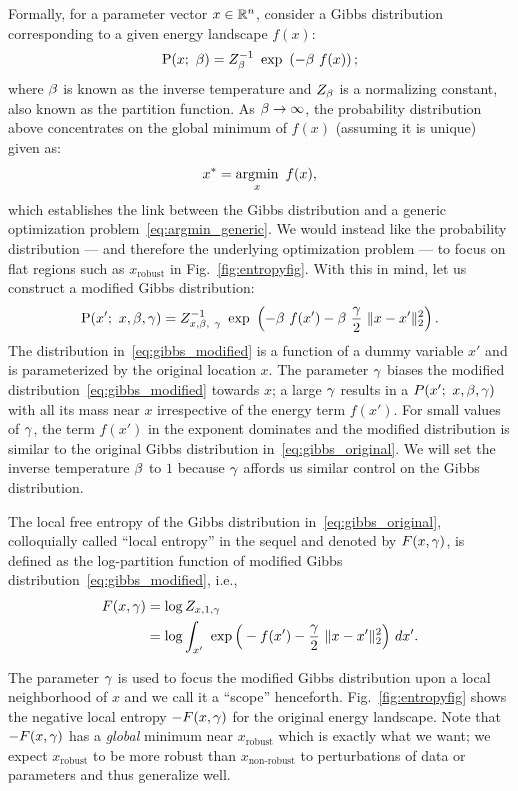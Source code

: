 \documentclass[10pt]{article}
\newcommand{\pc}[2]{{\color{ForestGreen}#1}\marginpar{\tiny\noindent{\raggedright{\color{Sienna}[PC]}\color{Sienna}{#2} \par}}}
\begin{document}
Formally, for a parameter vector $x \in \mathbb{R}^n$, consider a Gibbs distribution corresponding to a given energy landscape $f(x)$:
\begin{equation}
    \P(x;\ \b) = Z_\b^{-1}\ \exp\ \rbrac{-\b\ f(x)};
    \label{eq:gibbs_original}
\end{equation}
where $\beta$ is known as the inverse temperature and $Z_\beta$ is a normalizing constant, also known 
as the partition function. As $\beta \to \infty$, the probability distribution above concentrates on the global minimum of $f(x)$ (assuming it is unique) given as:
\begin{equation}
    x^* = \operatorname*{argmin}_x\ f(x),
    \label{eq:argmin_generic}
\end{equation}
which establishes the link between the Gibbs distribution and a generic optimization problem~\eqref{eq:argmin_generic}. We would instead like the probability distribution --- and therefore the underlying optimization problem --- to focus on flat regions such as $x_{\textrm{robust}}$ in Fig.~\ref{fig:entropyfig}. With this in mind, let us construct a modified Gibbs distribution:
\begin{equation}
    \P(x';\ x, \b, \g) = Z_{x,\b,\ \g}^{-1}\ \exp\ \rbrac{-\b\ f(x') - \b\ \f{\g}{2}\ \norm{x-x'}^2_2}.
    \label{eq:gibbs_modified}
\end{equation}
The distribution in~\eqref{eq:gibbs_modified} is a function of a dummy variable $x'$ and is parameterized by the original location $x$. The parameter $\gamma$ biases the modified distribution~\eqref{eq:gibbs_modified} towards $x$; a large $\gamma$ results in a $P(x';\ x,\beta,\gamma)$ with all its mass near $x$ irrespective of the energy term $f(x')$. For small values of $\gamma$, the term $f(x')$ in the exponent dominates and the modified distribution is similar to the original Gibbs distribution in~\eqref{eq:gibbs_original}. We will set the inverse temperature $\beta$ to $1$ because $\gamma$ affords us similar control on the Gibbs distribution.

\begin{definition}
\label{def:local_entropy}
The local free entropy of the Gibbs distribution in~\eqref{eq:gibbs_original}, colloquially called ``local entropy'' in the sequel and denoted by $F(x, \gamma)$, is defined as the log-partition function of modified Gibbs distribution~\eqref{eq:gibbs_modified}, i.e.,
\begin{align}
    F(x, \gamma) &= \log Z_{x, 1, \gamma} \notag\\
    &= \log \int_{x'}\ \exp \Big(-f(x') - \frac{\gamma}{2}\ \lVert x-x'\rVert^2_2 \Big)\ dx'.
    \label{eq:local_entropy}
\end{align}
\end{definition}
\pc{The parameter $\gamma$ is used to focus the modified Gibbs distribution upon a local neighborhood of $x$ and we call it a ``scope'' henceforth. Fig.~\ref{fig:entropyfig} shows the negative local entropy $-F(x, \gamma)$ for the original energy landscape.}{talk about small gamma and large gamma valleys} Note that $-F(x, \gamma)$ has a \emph{global} minimum near $x_{\textrm{robust}}$ which is exactly what we want; we expect $x_{\textrm{robust}}$ to be more robust than $x_{\textrm{non-robust}}$ to perturbations of data or parameters and thus generalize well.
\end{document}
